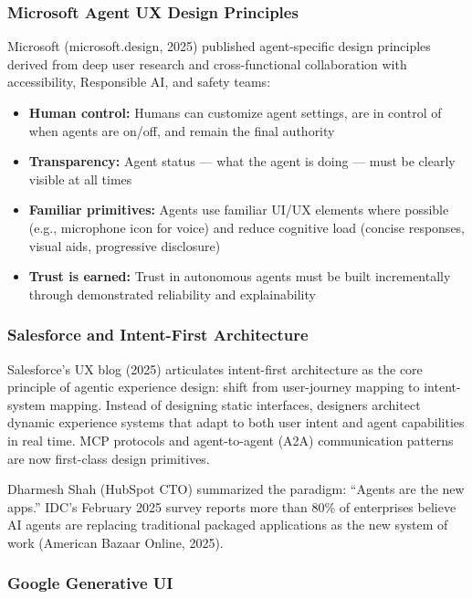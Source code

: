 \documentclass[11pt,letterpaper]{article}
\begin{document}
\subsubsection{Microsoft Agent UX Design Principles}

Microsoft (microsoft.design, 2025) published agent-specific design principles derived from deep user research and cross-functional collaboration with accessibility, Responsible AI, and safety teams:

\begin{itemize}[itemsep=0.3em]
  \item \textbf{Human control:} Humans can customize agent settings, are in control of when agents are on/off, and remain the final authority
  \item \textbf{Transparency:} Agent status --- what the agent is doing --- must be clearly visible at all times
  \item \textbf{Familiar primitives:} Agents use familiar UI/UX elements where possible (e.g., microphone icon for voice) and reduce cognitive load (concise responses, visual aids, progressive disclosure)
  \item \textbf{Trust is earned:} Trust in autonomous agents must be built incrementally through demonstrated reliability and explainability
\end{itemize}

\subsubsection{Salesforce and Intent-First Architecture}

Salesforce's UX blog (2025) articulates intent-first architecture as the core principle of agentic experience design: shift from user-journey mapping to intent-system mapping. Instead of designing static interfaces, designers architect dynamic experience systems that adapt to both user intent and agent capabilities in real time. MCP protocols and agent-to-agent (A2A) communication patterns are now first-class design primitives.

Dharmesh Shah (HubSpot CTO) summarized the paradigm: ``Agents are the new apps.'' IDC's February 2025 survey reports more than 80\% of enterprises believe AI agents are replacing traditional packaged applications as the new system of work (American Bazaar Online, 2025).

\subsubsection{Google Generative UI}
\end{document}
